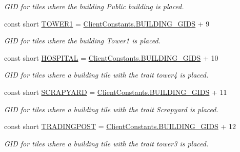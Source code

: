 \begin{DoxyCompactItemize}
\begin{DoxyCompactList}\small\item\em G\+I\+D for tiles where the building Public building is placed. \end{DoxyCompactList}\item 
const short \hyperlink{classClient_1_1Common_1_1Constants_1_1BuildingGid_a9518288b33138fb96c7894ce417498f8}{T\+O\+W\+E\+R1} = \hyperlink{classClient_1_1Common_1_1Constants_1_1ClientConstants_ad2e944ac733f952d3d0c2e24fe5d14ad}{Client\+Constants.\+B\+U\+I\+L\+D\+I\+N\+G\+\_\+\+G\+I\+D\+S} + 9
\begin{DoxyCompactList}\small\item\em G\+I\+D for tiles where the building Tower1 is placed. \end{DoxyCompactList}\item 
const short \hyperlink{classClient_1_1Common_1_1Constants_1_1BuildingGid_a74ffabb4007628c299979778aaeb53cd}{H\+O\+S\+P\+I\+T\+A\+L} = \hyperlink{classClient_1_1Common_1_1Constants_1_1ClientConstants_ad2e944ac733f952d3d0c2e24fe5d14ad}{Client\+Constants.\+B\+U\+I\+L\+D\+I\+N\+G\+\_\+\+G\+I\+D\+S} + 10
\begin{DoxyCompactList}\small\item\em G\+I\+D for tiles where a building tile with the trait tower4 is placed. \end{DoxyCompactList}\item 
const short \hyperlink{classClient_1_1Common_1_1Constants_1_1BuildingGid_a733cb9902af81d9ca9bc0fa64e44a1e0}{S\+C\+R\+A\+P\+Y\+A\+R\+D} = \hyperlink{classClient_1_1Common_1_1Constants_1_1ClientConstants_ad2e944ac733f952d3d0c2e24fe5d14ad}{Client\+Constants.\+B\+U\+I\+L\+D\+I\+N\+G\+\_\+\+G\+I\+D\+S} + 11
\begin{DoxyCompactList}\small\item\em G\+I\+D for tiles where a building tile with the trait Scrapyard is placed. \end{DoxyCompactList}\item 
const short \hyperlink{classClient_1_1Common_1_1Constants_1_1BuildingGid_aa6660c0b27df8d12b9c1c417027cea43}{T\+R\+A\+D\+I\+N\+G\+P\+O\+S\+T} = \hyperlink{classClient_1_1Common_1_1Constants_1_1ClientConstants_ad2e944ac733f952d3d0c2e24fe5d14ad}{Client\+Constants.\+B\+U\+I\+L\+D\+I\+N\+G\+\_\+\+G\+I\+D\+S} + 12
\begin{DoxyCompactList}\small\item\em G\+I\+D for tiles where a building tile with the trait tower3 is placed. \end{DoxyCompactList}\item 

\end{DoxyCompactItemize}
